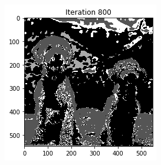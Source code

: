 \documentclass[11pt]{article}
\begin{document}
\begin{figure}[!htb]
\begin{center}
\begin{multicols}{5}
	\includegraphics[height = \linewidth]{dogs_800}\par
\end{multicols}


\end{center}
\end{figure}
\end{document}
